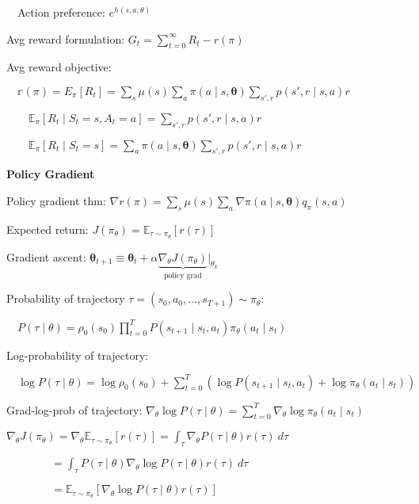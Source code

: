 \documentclass[twocolumn]{article}
\begin{document}
$\quad$Action preference: $e^{h(s,a, \theta)}$

Avg reward formulation: $G_t = \sum_{t=0}^\infty R_t - r(\pi)$

Avg reward objective:

$\quad \mathbb r(\pi) = E_\pi[R_t] = \sum_s \mu(s) \sum_a \pi(a \mid s, \boldsymbol \theta) \sum_{s', r} p(s', r \mid s, a) r$

$\quad\quad \mathbb E_\pi[R_t \mid S_t = s, A_t = a] = \sum_{s', r} p(s', r \mid s, a) r$

$\quad\quad \mathbb E_\pi[R_t \mid S_t = s] = \sum_a \pi(a \mid s, \boldsymbol \theta) \sum_{s', r} p(s', r \mid s, a) r$

\dotfill

\textbf{Policy Gradient}

Policy gradient thm: $\nabla r(\pi) = \sum_s \mu(s) \sum_a \nabla \pi(a \mid s, \boldsymbol \theta) q_\pi(s,a)$

Expected return: $J(\pi_\theta) = \mathbb E_{\tau \sim \pi_\theta} [r(\tau)]$

Gradient ascent: $\boldsymbol \theta_{t+1} \equiv \boldsymbol \theta_t + \alpha \underbrace{\nabla_\theta J(\pi_\theta)}_{\text{policy grad}} \vert_{\theta_k}$

Probability of trajectory $\tau = (s_0, a_0, \dots, s_{T+1}) \sim \pi_\theta$:

$\quad P(\tau \mid \theta) = \rho_0(s_0) \prod_{t=0}^T P(s_{t+1} \mid s_t, a_t) \pi_\theta(a_t \mid s_t)$

Log-probability of trajectory:

$\quad \log P(\tau \mid \theta) = \log \rho_0 (s_0) + \sum_{t=0}^T \left( \log P(s_{t+1} \mid s_t, a_t) + \log \pi_\theta (a_t \mid s_t) \right)$

Grad-log-prob of trajectory: $\nabla_\theta \log P(\tau \mid \theta) = \sum_{t=0}^T \nabla_\theta \log \pi_\theta (a_t \mid s_t)$


\cleardoublepage

$\nabla_\theta J(\pi_\theta) = \nabla_\theta \mathbb E_{\tau \sim \pi_\theta} [r(\tau)] =  \int_\tau \nabla_\theta P(\tau \mid \theta) r(\tau)\ d\tau$

$\hspace{4em} = \int_\tau P(\tau \mid \theta) \nabla_\theta \log P(\tau \mid \theta) r(\tau)\ d\tau$

$\hspace{4em} = \mathbb E_{\tau \sim \pi_\theta} [\nabla_\theta \log P(\tau \mid \theta) r(\tau)]$
\end{document}
